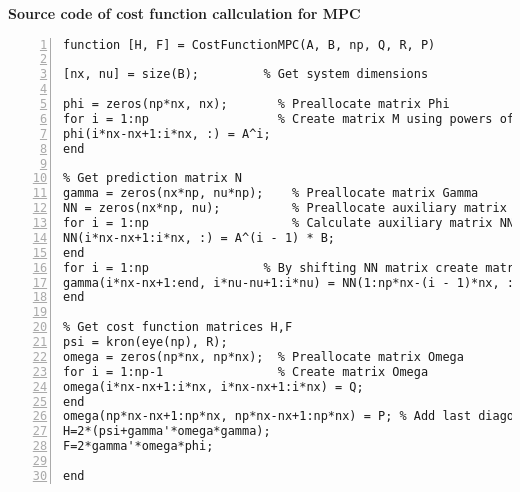 \normalsize\bf{Source code of cost function callculation for MPC}
\label{mpcCostFcn.m}
\vspace{1cm}
\begin{lstlisting}[numbers=left,basicstyle=\scriptsize,caption={Source code of cost function callculation for MPC.},captionpos=b]	
function [H, F] = CostFunctionMPC(A, B, np, Q, R, P)

[nx, nu] = size(B);         % Get system dimensions

phi = zeros(np*nx, nx);       % Preallocate matrix Phi
for i = 1:np                  % Create matrix M using powers of matrix A
phi(i*nx-nx+1:i*nx, :) = A^i; 
end

% Get prediction matrix N
gamma = zeros(nx*np, nu*np);    % Preallocate matrix Gamma
NN = zeros(nx*np, nu);          % Preallocate auxiliary matrix NN with zeros
for i = 1:np                    % Calculate auxiliary matrix NN
NN(i*nx-nx+1:i*nx, :) = A^(i - 1) * B; 
end
for i = 1:np                % By shifting NN matrix create matrix Gamma
gamma(i*nx-nx+1:end, i*nu-nu+1:i*nu) = NN(1:np*nx-(i - 1)*nx, :); 
end

% Get cost function matrices H,F
psi = kron(eye(np), R);
omega = zeros(np*nx, np*nx);  % Preallocate matrix Omega
for i = 1:np-1                % Create matrix Omega
omega(i*nx-nx+1:i*nx, i*nx-nx+1:i*nx) = Q; 
end
omega(np*nx-nx+1:np*nx, np*nx-nx+1:np*nx) = P; % Add last diagonal element
H=2*(psi+gamma'*omega*gamma);
F=2*gamma'*omega*phi;

end
\end{lstlisting}